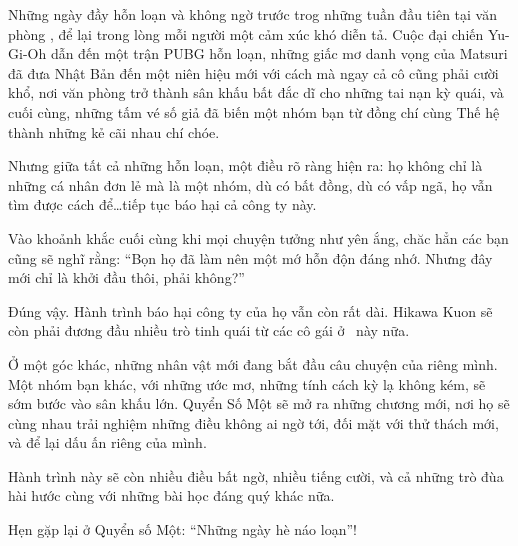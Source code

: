 \documentclass[main.tex]{subfiles}
\begin{document}
\color{black}

Những ngày đầy hỗn loạn và không ngờ trước trog những tuần đầu tiên tại văn phòng \hll, để lại trong lòng mỗi người một cảm xúc khó diễn tả. Cuộc đại chiến Yu-Gi-Oh dẫn đến một trận PUBG hỗn loạn, những giấc mơ danh vọng của Matsuri đã đưa Nhật Bản đến một niên hiệu mới với cách mà ngay cả cô cũng phải cười khổ, nơi văn phòng trở thành sân khấu bất đắc dĩ cho những tai nạn kỳ quái, và cuối cùng, những tấm vé số giả đã biến một nhóm bạn từ đồng chí cùng Thế hệ thành những kẻ cãi nhau chí chóe.

Nhưng giữa tất cả những hỗn loạn, một điều rõ ràng hiện ra: họ không chỉ là những cá nhân đơn lẻ mà là một nhóm, dù có bất đồng, dù có vấp ngã, họ vẫn tìm được cách để\ldots tiếp tục báo hại cả công ty này.

Vào khoảnh khắc cuối cùng khi mọi chuyện tưởng như yên ắng, chăc hẳn các bạn cũng sẽ nghĩ rằng: ``Bọn họ đã làm nên một mớ hỗn độn đáng nhớ. Nhưng đây mới chỉ là khởi đầu thôi, phải không?''

Đúng vậy. Hành trình báo hại công ty của họ vẫn còn rất dài. Hikawa Kuon sẽ còn phải đương đầu nhiều trò tinh quái từ các cô gái ở \hll\  này nữa.

Ở một góc khác, những nhân vật mới đang bắt đầu câu chuyện của riêng mình. Một nhóm bạn khác, với những ước mơ, những tính cách kỳ lạ không kém, sẽ sớm bước vào sân khấu lớn. Quyển Số Một sẽ mở ra những chương mới, nơi họ sẽ cùng nhau trải nghiệm những điều không ai ngờ tới, đối mặt với thử thách mới, và để lại dấu ấn riêng của mình.

Hành trình này sẽ còn nhiều điều bất ngờ, nhiều tiếng cười, và cả những trò đùa hài hước cùng với những bài học đáng quý khác nữa.

Hẹn gặp lại ở Quyển số Một: ``Những ngày hè náo loạn''!
\end{document}
